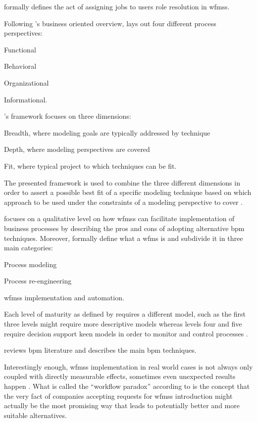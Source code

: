 \citet{Cheng2000} formally defines the act of assigning jobs to users \ie role resolution in \glspl{wfms}.

Following \citet{Georgakopoulos1995}'s business oriented overview, \citet{Giaglis2001} lays out four different process perspectives:
\begin{enumerate*}
	\item Functional
	\item Behavioral
	\item Organizational
	\item Informational.
\end{enumerate*}
\citet{Giaglis2001}'s framework focuses on three dimensions:
\begin{enumerate*}
	\item Breadth, where modeling goals are typically addressed by technique
	\item Depth, where modeling perspectives are covered
	\item Fit, where typical project to which techniques can be fit.
\end{enumerate*}
The presented framework is used to combine the three different dimensions in order to assert a possible best fit of a specific modeling technique based on which approach to be used under the constraints of a modeling perspective to cover \citep{Giaglis2001}.

\citet{Mentzas2001} focuses on a qualitative level on how \glspl{wfms} can facilitate implementation of business processes by describing the pros and cons of adopting alternative \gls{bpm} techniques. Moreover, \citet{Mentzas2001} formally define what a \gls{wfms} is and subdivide it in three main categories:
\begin{enumerate*}
	\item Process modeling
	\item Process re-engineering
	\item \glspl{wfms} implementation and automation.
\end{enumerate*}
Each level of maturity as defined by \citet{Macintosh1993} requires a different model, such as the first three levels might require more descriptive models whereas levels four and five require decision support keen models in order to monitor and control processes \citep{Mentzas2001}.

\citet{Aguilar-Saven2004} reviews \gls{bpm} literature and describes the main \gls{bpm} techniques.

Interestingly enough, \glspl{wfms} implementation in real world cases is not always only coupled with directly measurable effects, sometimes even unexpected results happen \citep{Reijers2005}. What is called the ``workflow paradox'' according to \citet{Reijers2005} is the concept that the very fact of companies accepting requests for \glspl{wfms} introduction might actually be the most promising way that leads to potentially better and more suitable alternatives.

